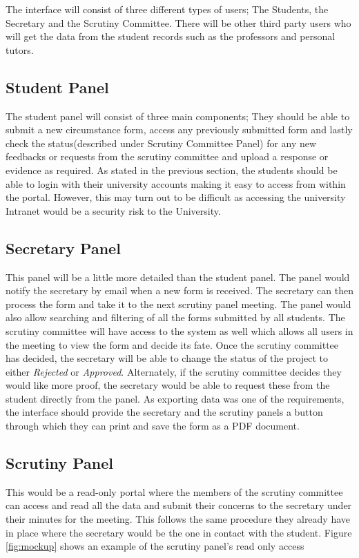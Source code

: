 \documentclass[../main.tex]{subfiles}
\begin{document}
\raggedright
The interface will consist of three different types of users; The Students, the Secretary and the Scrutiny Committee. There will be other third party users who will get the data from the student records such as the professors and personal tutors. 

\subsection{Student Panel}
The student panel will consist of three main components; They should be able to submit a new circumstance form, access any previously submitted form and lastly check the status(described under Scrutiny Committee Panel) for any new feedbacks or requests from the scrutiny committee and upload a response or evidence as required. As stated in the previous section, the students should be able to login with their university accounts making it easy to access from within the portal. However, this may turn out to be difficult as accessing the university Intranet would be a security risk to the University.

\subsection{Secretary Panel}
This panel will be a little more detailed than the student panel. The panel would notify the secretary by email when a new form is received. The secretary can then process the form and take it to the next scrutiny panel meeting. The panel would also allow searching and filtering of all the forms submitted by all students. The scrutiny committee will have access to the system as well which allows all users in the meeting to view the form and decide its fate. Once the scrutiny committee has decided, the secretary will be able to change the status of the project to either \textit{Rejected} or \textit{Approved}. Alternately, if the scrutiny committee decides they would like more proof, the secretary would be able to request these from the student directly from the panel. As exporting data was one of the requirements, the interface should provide the secretary and the scrutiny panels a button through which they can print and save the form as a PDF document. 

\subsection{Scrutiny Panel}
This would be a read-only portal where the members of the scrutiny committee can access and read all the data and submit their concerns to the secretary under their minutes for the meeting. This follows the same procedure they already have in place where the secretary would be the one in contact with the student. Figure \ref{fig:mockup} shows an example of the scrutiny panel's read only access
\end{document}

